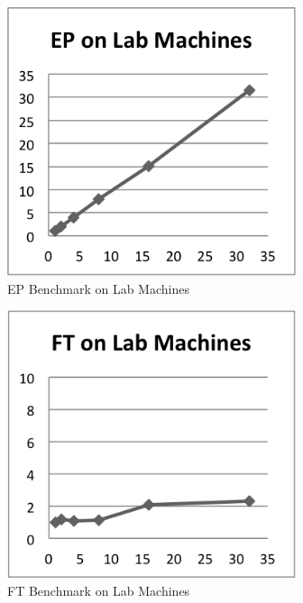 \documentclass{acm_proc_article-sp}
\begin{document}
\begin{figure}[tbp]
  \centering
  \caption{EP Benchmark on Lab Machines}
  \label{LabEP}
  \includegraphics[width=20pc]{Pics-Lab/EP.png}
\end{figure}

\begin{figure}[tbp]
  \centering
  \caption{FT Benchmark on Lab Machines}
	\label{LabFT}
  \includegraphics[width=20pc]{Pics-Lab/FT.png}
\end{figure}
\end{document}
